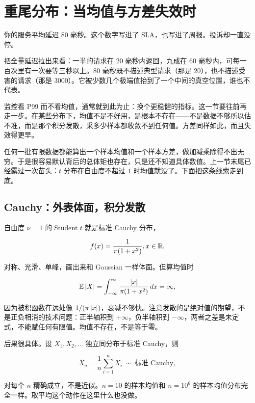 \section{重尾分布：当均值与方差失效时}
\label{sec:05-Probability/06-Common-Distributions/07}

你的服务平均延迟 \(80\) 毫秒。这个数字写进了 SLA，也写进了周报。投诉却一直没停。

把全量延迟拉出来看：一半的请求在 \(20\) 毫秒内返回，九成在 \(60\) 毫秒内，可每一百次里有一次要等三秒以上。\(80\) 毫秒既不描述典型请求（那是 \(20\)），也不描述受害的请求（那是 \(3000\)）。它被少数几个极端值抬到了一个中间的真空位置，谁也不代表。

监控看 P99 而不看均值，通常就到此为止：换个更稳健的指标。这一节要往前再走一步。在某些分布下，均值不是不好用，是根本不存在——不是数据不够所以估不准，而是那个积分发散，采多少样本都收敛不到任何值。方差同样如此，而且失效得更早。

任何一批有限数据都能算出一个样本均值和一个样本方差，做加减乘除得不出无穷。于是很容易默认背后的总体矩也存在，只是还不知道具体数值。上一节末尾已经露过一次苗头：\(t\) 分布在自由度不超过 \(1\) 时均值就没了。下面把这条线索走到底。

\subsection{Cauchy：外表体面，积分发散}

自由度 \(\nu=1\) 的 Student \(t\) 就是标准 Cauchy 分布，

\[
f(x)=\frac{1}{\pi(1+x^2)},\space x\in\mathbb{R} .
\]

对称、光滑、单峰，画出来和 Gaussian 一样体面。但算均值时

\[
\mathbb{E}\left|X\right|=\int_{-\infty}^{\infty}\frac{\left|x\right|}{\pi(1+x^2)}\,dx=\infty,
\]

因为被积函数在远处像 \(1/(\pi\left|x\right|)\)，衰减不够快。注意发散的是绝对值的期望，不是正负相消的技术问题：正半轴积到 \(+\infty\)，负半轴积到 \(-\infty\)，两者之差是未定式，不能赋任何有限值。均值不存在，不是等于零。

后果很具体。设 \(X_1,X_2,\ldots\) 独立同分布于标准 Cauchy，则

\[
\bar X_n=\frac1n\sum_{i=1}^n X_i\ \sim\ \text{标准 Cauchy},
\]

对每个 \(n\) 精确成立，不是近似。\(n=10\) 的样本均值和 \(n=10^6\) 的样本均值分布完全一样。取平均这个动作在这里什么也没做。

